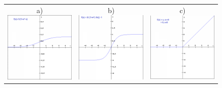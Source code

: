 \begin{figure}
    \begin{tabular}{ccc}
         a) \includegraphics[scale=0.4]{./tex/fondamentaux/sigmoid.png} &
         b) \includegraphics[scale=0.4]{./tex/fondamentaux/tanh.png} &
         c) \includegraphics[scale=0.4]{./tex/fondamentaux/relu.png}  \\

\end{tabular}
\end{figure}
